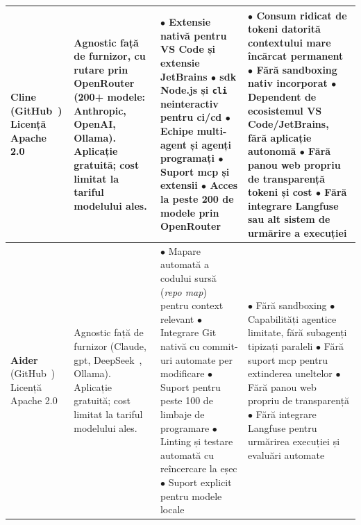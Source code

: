 \documentclass[12pt, a4paper, oneside, romanian]{teza-upb}
\begin{document}
\begin{table}[H]
\begin{tabularx}{\textwidth}{@{} >{\hsize=0.55\hsize\RaggedRight}X >{\hsize=0.95\hsize\RaggedRight}X >{\hsize=1.25\hsize\RaggedRight}X >{\hsize=1.25\hsize\RaggedRight}X @{}}
        \textbf{Cline} \newline (GitHub~\cite{gh_cline}) \newline Licență Apache 2.0 &
        Agnostic față de furnizor, cu rutare prin OpenRouter~\cite{web_openrouter} (200+ modele: Anthropic, OpenAI, Ollama). \newline
        Aplicație gratuită; cost limitat la tariful modelului ales. &
        $\bullet$ Extensie nativă pentru VS Code și extensie JetBrains\newline
        $\bullet$ \ac{sdk} Node.js și \texttt{cli} neinteractiv pentru \ac{ci}/\ac{cd}\newline
        $\bullet$ Echipe multi-agent și agenți programați\newline
        $\bullet$ Suport \ac{mcp} și extensii\newline
        $\bullet$ Acces la peste 200 de modele prin OpenRouter &
        $\bullet$ Consum ridicat de tokeni datorită contextului mare încărcat permanent\newline
        $\bullet$ Fără sandboxing nativ incorporat\newline
        $\bullet$ Dependent de ecosistemul VS Code/JetBrains, fără aplicație autonomă\newline
        $\bullet$ Fără panou web propriu de transparență tokeni și cost\newline
        $\bullet$ Fără integrare Langfuse sau alt sistem de urmărire a execuției \\
        \midrule

        \textbf{Aider} \newline (GitHub~\cite{gh_aider}) \newline Licență Apache 2.0 &
        Agnostic față de furnizor (Claude, \ac{gpt}, DeepSeek~\cite{web_deepseek}, Ollama). \newline
        Aplicație gratuită; cost limitat la tariful modelului ales. &
        $\bullet$ Mapare automată a codului sursă (\textit{repo map}) pentru context relevant\newline
        $\bullet$ Integrare Git nativă cu commit-uri automate per modificare\newline
        $\bullet$ Suport pentru peste 100 de limbaje de programare\newline
        $\bullet$ Linting și testare automată cu reîncercare la eșec\newline
        $\bullet$ Suport explicit pentru modele locale &
        $\bullet$ Fără sandboxing\newline
        $\bullet$ Capabilități agentice limitate, fără subagenți tipizați paraleli\newline
        $\bullet$ Fără suport \ac{mcp} pentru extinderea uneltelor\newline
        $\bullet$ Fără panou web propriu de transparență\newline
        $\bullet$ Fără integrare Langfuse pentru urmărirea execuției și evaluări automate \\


\end{tabularx}
\end{table}
\end{document}
